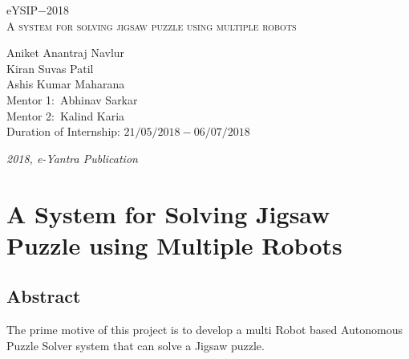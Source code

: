 \documentclass[a4paper,12pt,oneside]{book}
\begin{document}
\begin{titlepage}
\raggedright
{\Large eYSIP$-$2018\\[1 cm]}
{\Huge\scshape A system for solving jigsaw puzzle using multiple robots\\[.1 in]}
\vfill
\begin{flushright}
{\large Aniket Anantraj Navlur \\}
{\large Kiran Suvas Patil\\}
{\large Ashis Kumar Maharana\\}
{\large Mentor 1$:$ Abhinav Sarkar\\}
{\large Mentor 2$:$ Kalind Karia\\}
{\large Duration of Internship: $ 21/05/2018-06/07/2018 $ \\}
\end{flushright}

{\itshape 2018, e-Yantra Publication}
\end{titlepage}

\chapter[Project Tag]{A System for Solving Jigsaw Puzzle using Multiple Robots}
\section*{Abstract}
The prime motive of this project is to develop a multi Robot based \hspace{0 em} Autonomous Puzzle Solver system that can solve a Jigsaw puzzle.
\end{document}
